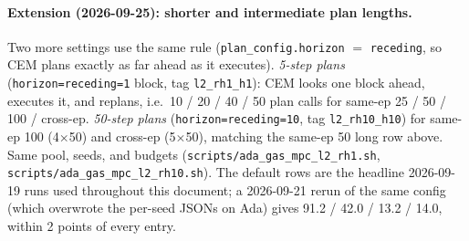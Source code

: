 \documentclass[11pt]{article}
\begin{document}
\paragraph{Extension (2026-09-25): shorter and intermediate plan lengths.}
Two more settings use the same rule (\texttt{plan\_config.horizon} $=$ \texttt{receding}, so
CEM plans exactly as far ahead as it executes). \emph{5-step plans} (\texttt{horizon=receding=1}
block, tag \texttt{l2\_rh1\_h1}): CEM looks one block ahead, executes it, and replans, i.e.\
10 / 20 / 40 / 50 plan calls for same-ep 25 / 50 / 100 / cross-ep. \emph{50-step plans}
(\texttt{horizon=receding=10}, tag \texttt{l2\_rh10\_h10}) for same-ep 100 (4$\times$50) and
cross-ep (5$\times$50), matching the same-ep 50 long row above. Same pool, seeds, and budgets
(\texttt{scripts/ada\_gas\_mpc\_l2\_rh1.sh}, \texttt{scripts/ada\_gas\_mpc\_l2\_rh10.sh}).
The default rows are the headline 2026-09-19 runs used throughout this document; a 2026-09-21
rerun of the same config (which overwrote the per-seed JSONs on Ada) gives
91.2 / 42.0 / 13.2 / 14.0, within 2 points of every entry.
\end{document}
